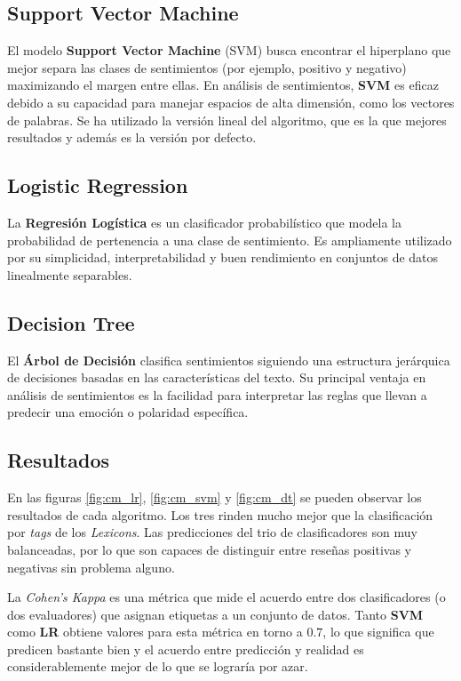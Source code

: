 \documentclass[12pt,letterpaper]{article}
\begin{document}
\subsection{Support Vector Machine}
El modelo \textbf{Support Vector Machine} (SVM) busca encontrar el hiperplano que mejor separa las clases de sentimientos (por ejemplo, positivo y negativo) maximizando el margen entre ellas. En análisis de sentimientos, \textbf{SVM} es eficaz debido a su capacidad para manejar espacios de alta dimensión, como los vectores de palabras. Se ha utilizado la versión lineal del algoritmo, que es la que mejores resultados y además es la versión por defecto.

\subsection{Logistic Regression}
La \textbf{Regresión Logística} es un clasificador probabilístico que modela la probabilidad de pertenencia a una clase de sentimiento. Es ampliamente utilizado por su simplicidad, interpretabilidad y buen rendimiento en conjuntos de datos linealmente separables.

\subsection{Decision Tree}
El \textbf{Árbol de Decisión} clasifica sentimientos siguiendo una estructura jerárquica de decisiones basadas en las características del texto. Su principal ventaja en análisis de sentimientos es la facilidad para interpretar las reglas que llevan a predecir una emoción o polaridad específica.

\subsection{Resultados}

En las figuras \ref{fig:cm_lr}, \ref{fig:cm_svm} y \ref{fig:cm_dt} se pueden observar los resultados de cada algoritmo. Los tres rinden mucho mejor que la clasificación por \textit{tags} de los \textit{Lexicons}. Las predicciones del trio de clasificadores son muy balanceadas, por lo que son capaces de distinguir entre reseñas positivas y negativas sin problema alguno.

La \textit{Cohen's Kappa} es una métrica que mide el acuerdo entre dos clasificadores (o dos evaluadores) que asignan etiquetas a un conjunto de datos. Tanto \textbf{SVM} como \textbf{LR} obtiene valores para esta métrica en torno a $0.7$, lo que significa que predicen bastante bien y el acuerdo entre predicción y realidad es considerablemente mejor de lo que se lograría por azar.
\end{document}
